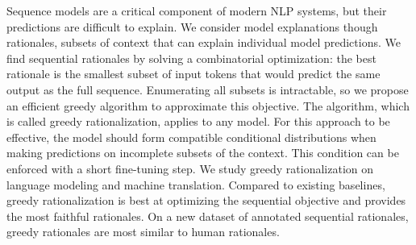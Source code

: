 Sequence models are a critical component of modern NLP systems, but their predictions are difficult to explain. We consider model explanations though rationales, subsets of context that can explain individual model predictions. We find sequential rationales by solving a combinatorial optimization: the best rationale is the smallest subset of input tokens that would predict the same output as the full sequence. Enumerating all subsets is intractable, so we propose an efficient greedy algorithm to approximate this objective. The algorithm, which is called greedy rationalization, applies to any model. For this approach to be effective, the model should form compatible conditional distributions when making predictions on incomplete subsets of the context. This condition can be enforced with a short fine-tuning step. We study greedy rationalization on language modeling and machine translation. Compared to existing baselines, greedy rationalization is best at optimizing the sequential objective and provides the most faithful rationales. On a new dataset of annotated sequential rationales, greedy rationales are most similar to human rationales.
